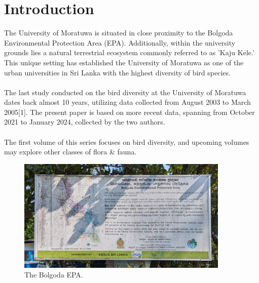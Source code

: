 \chapter{Introduction}
\label{cp:introduction}
The University of Moratuwa is situated in close proximity to the Bolgoda Environmental Protection Area (EPA). Additionally, within the university grounds lies a natural terrestrial ecosystem commonly referred to as 'Kaju Kele.' This unique setting has established the University of Moratuwa as one of the urban universities in Sri Lanka with the highest diversity of bird species.
\\\\
The last study conducted on the bird diversity at the University of Moratuwa dates back almost 10 years, utilizing data collected from August 2003 to March 2005[1]. The present paper is based on more recent data, spanning from October 2021 to January 2024, collected by the two authors.
\\\\
The first volume of this series focuses on bird diversity, and upcoming volumes may explore other classes of flora \& fauna.
\begin{figure}[!htpb]
    \centering
    \includegraphics[width=0.9\textwidth]{Figures/epa.jpg}
    \caption[]{The Bolgoda EPA.}
    \label{fig:figure-01}
\end{figure}

